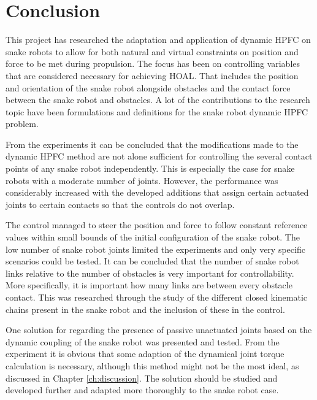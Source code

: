 \chapter{Conclusion}\label{ch:conclusion}

This project has researched the adaptation and application of dynamic HPFC on snake robots to allow for both natural and virtual constraints on position and force to be met during propulsion. The focus has been on controlling variables that are considered necessary for achieving HOAL. That includes the position and orientation of the snake robot alongside obstacles and the contact force between the snake robot and obstacles. A lot of the contributions to the research topic have been formulations and definitions for the snake robot dynamic HPFC problem.

From the experiments it can be concluded that the modifications made to the dynamic HPFC method are not alone sufficient for controlling the several contact points of any snake robot independently. This is especially the case for snake robots with a moderate number of joints. However, the performance was considerably increased with the developed additions that assign certain actuated joints to certain contacts so that the controls do not overlap.


The control managed to steer the position and force to follow constant reference values within small bounds of the initial configuration of the snake robot. The low number of snake robot joints limited the experiments and only very specific scenarios could be tested. It can be concluded that the number of snake robot links relative to the number of obstacles is very important for controllability. More specifically, it is important how many links are between every  obstacle contact. This was researched through the study of the different closed kinematic chains present in the snake robot and the inclusion of these in the control.

One solution for regarding the presence of passive unactuated joints based on the dynamic coupling of the snake robot was presented and tested. From the experiment it is obvious that some adaption of the dynamical joint torque calculation is necessary, although this method might not be the most ideal, as discussed in Chapter \ref{ch:discussion}. The solution should be studied and developed further and adapted more thoroughly to the snake robot case.


